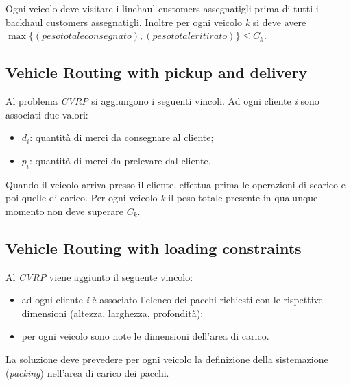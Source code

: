 \documentclass[11pt]{book}
\begin{document}
Ogni veicolo deve visitare i linehaul customers assegnatigli prima di
tutti i backhaul customers assegnatigli. Inoltre per ogni veicolo {\em
  k} si deve avere $\max\{(peso totale consegnato),(peso totale
ritirato)\} \leq C_k$.

\subsection{Vehicle Routing with pickup and delivery}

Al problema {\em CVRP} si aggiungono i seguenti vincoli. Ad ogni
cliente {\em i} sono associati due valori:

\begin{itemize}
\item $d_i$: quantit\`a di merci da consegnare al cliente;
\item $p_i$: quantit\`a di merci da prelevare dal cliente.
\end{itemize}

Quando il veicolo arriva presso il cliente, effettua prima le
operazioni di scarico e poi quelle di carico. Per ogni veicolo {\em k}
il peso totale presente in qualunque momento non deve superare $C_k$.

\subsection{Vehicle Routing with loading constraints}

Al {\em CVRP} viene aggiunto il seguente vincolo:

\begin{itemize}
\item ad ogni cliente {\em i} \`e associato l'elenco dei pacchi
  richiesti con le rispettive dimensioni (altezza, larghezza,
  profondit\`a);
\item per ogni veicolo sono note le dimensioni dell'area di carico.
\end{itemize}

La soluzione deve prevedere per ogni veicolo la definizione della
sistemazione ({\em packing}) nell'area di carico dei pacchi.
\end{document}
